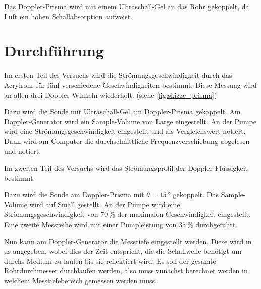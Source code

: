 Das Doppler-Prisma wird mit einem Ultraschall-Gel an das Rohr gekoppelt, da Luft ein hohen Schallabsorption aufweist.


\section{Durchführung}
\label{sec:Durchführung}

Im ersten Teil des Versuchs wird die Strömungsgeschwindigkeit durch das Acrylrohr für fünf verschiedene Geschwindigkeiten bestimmt. 
Diese Messung wird an allen drei Doppler-Winkeln wiederholt. (siehe \autoref{fig:skizze_prisma})

Dazu wird die Sonde mit Ultraschall-Gel am Doppler-Prisma gekoppelt.
Am Doppler-Generator wird ein Sample-Volume von Large eingestellt.
An der Pumpe wird eine Strömungsgeschwindigkeit eingestellt und als Vergleichswert notiert.
Dann wird am Computer die durchschnittliche Frequenzverschiebung abgelesen und notiert.

Im zweiten Teil des Versuchs wird das Strömungsprofil der Doppler-Flüssigkeit bestimmt.

Dazu wird die Sonde am Doppler-Prisma mit $\theta=\SI{15}{\degree}$ gekoppelt.
Das Sample-Volume wird auf Small gestellt.
An der Pumpe wird eine Strömungsgeschwindigkeit von $\SI{70}{\percent}$ der maximalen Geschwindigkeit eingestellt.
Eine zweite Messreihe wird mit einer Pumpleistung von $\SI{35}{\percent}$ durchgeführt.

Nun kann am Doppler-Generator die Messtiefe eingestellt werden.
Diese wird in $\si{\micro\second}$ angegeben, wobei dies der Zeit entspricht, die die Schallwelle benötigt um durchs Medium zu laufen bis sie reflektiert wird.
Es soll der gesamte Rohrdurchmesser durchlaufen werden, also muss zunächst berechnet werden in welchem Messtiefebereich gemessen werden muss.

